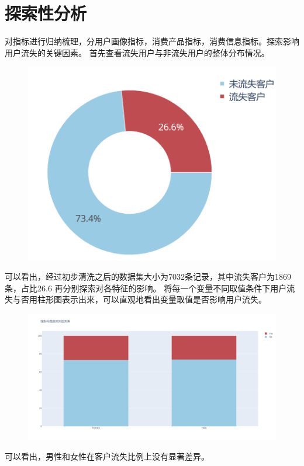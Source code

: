 \documentclass{article}
\begin{document}
\section{探索性分析}
对指标进行归纳梳理，分用户画像指标，消费产品指标，消费信息指标。探索影响用户流失的关键因素。
首先查看流失用户与非流失用户的整体分布情况。
\begin{figure}[H]
	\centering
	\includegraphics[width=\textwidth]{./img/t1.png}
\end{figure}
可以看出，经过初步清洗之后的数据集大小为7032条记录，其中流失客户为1869条，占比26.6%
再分别探索对各特征的影响。
将每一个变量不同取值条件下用户流失与否用柱形图表示出来，可以直观地看出变量取值是否影响用户流失。

\begin{figure}[H]
	\centering
	\includegraphics[width=\textwidth]{./img/t2.png}
\end{figure}
可以看出，男性和女性在客户流失比例上没有显著差异。
\end{document}
